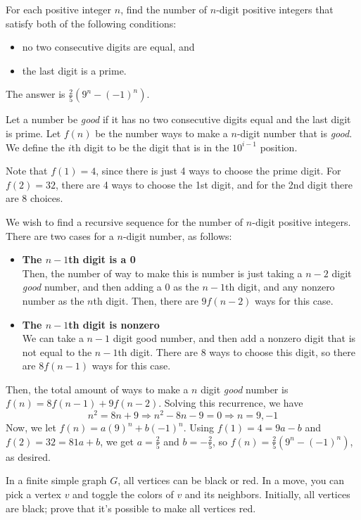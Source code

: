 \documentclass{article}
\begin{document}
\begin{exam}[JMO 2018/1]
For each positive integer $n$, find the number of $n$-digit positive integers that satisfy both of the following conditions:\begin{itemize}\item no two consecutive digits are equal, and\item the last digit is a prime.\end{itemize}
\end{exam}

\begin{sol}
The answer is $\boxed{\frac{2}{5}(9^n-(-1)^n)}$. 

Let a number be \textit{good} if it has no two consecutive digits equal and the last digit is prime. Let $f(n)$ be the number ways to make a $n$-digit number that is \textit{good}. We define the $i$th digit to be the digit that is in the $10^{i-1}$ position.

Note that $f(1)=4$, since there is just 4 ways to choose the prime digit. For $f(2)=32$, there are 4 ways to choose the 1st digit, and for the 2nd digit there are 8 choices. 

We wish to find a recursive sequence for the number of $n$-digit positive integers. There are two cases for a $n$-digit number, as follows:  
\begin{itemize}
    \item \textbf{The $n-1$th digit is a 0} \\
     Then, the number of way to make this is number is just taking a $n-2$ digit \textit{good} number, and then adding a 0 as the $n-1$th digit, and any nonzero number as the $n$th digit. Then, there are $9f(n-2)$ ways for this case. 
    \item \textbf{The $n-1$th digit is nonzero} \\
    We can take a $n-1$ digit good number, and then add a nonzero digit that is not equal to the $n-1$th digit. There are 8 ways to choose this digit, so there are $8f(n-1)$ ways for this case. 
\end{itemize}
Then, the total amount of ways to make a $n$ digit \textit{good} number is $f(n)=8f(n-1)+9f(n-2)$. Solving this recurrence, we have
\[n^2=8n+9 \Rightarrow n^2-8n-9=0 \Rightarrow n=9, -1\]
Now, we let $f(n)=a(9)^n+b(-1)^n$. Using $f(1)=4=9a-b$ and $f(2)=32=81a+b$, we get $a=\frac{2}{5}$ and $b=-\frac{2}{5}$, so $f(n)=\frac{2}{5}(9^n-(-1)^n)$, as desired.
\end{sol}

\begin{exam}
In a finite simple graph $G$, all vertices can be black or red. In a move, you can pick a vertex $v$ and toggle the colors of $v$ and its neighbors. Initially, all vertices are black; prove that it's possible to make all vertices red.
\end{exam}
\end{document}
